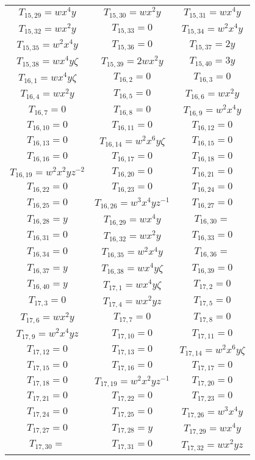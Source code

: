 \documentclass[12pt]{memoireuqam1.3}
\begin{document}
\begin{longtable}{|c|c|c|}
$T_{15,29}= wx^4y$&
$T_{15,30}= wx^2y$&
$T_{15,31}= wx^4y$\\
$T_{15,32}= wx^2y$&
$T_{15,33}= 0$&
$T_{15,34}= w^2x^4y$\\
$T_{15,35}= w^2x^4y$&
$T_{15,36}= 0$&
$T_{15,37}= 2y$\\
$T_{15,38}= wx^4y\zeta$&
$T_{15,39}= 2wx^2y$&
$T_{15,40}= 3y$\\
$T_{16,1}= wx^4y\zeta$&
$T_{16,2}= 0$&
$T_{16,3}= 0$\\
$T_{16,4}= wx^2y$&
$T_{16,5}= 0$&
$T_{16,6}= wx^2y$\\
$T_{16,7}= 0$&
$T_{16,8}= 0$&
$T_{16,9}= w^2x^4y$\\
$T_{16,10}= 0$&
$T_{16,11}= 0$&
$T_{16,12}= 0$\\
$T_{16,13}= 0$&
$T_{16,14}= w^2x^6y\zeta$&
$T_{16,15}= 0$\\
$T_{16,16}= 0$&
$T_{16,17}= 0$&
$T_{16,18}= 0$\\
$T_{16,19}= w^2x^2yz^{-2}$&
$T_{16,20}= 0$&
$T_{16,21}= 0$\\
$T_{16,22}= 0$&
$T_{16,23}= 0$&
$T_{16,24}= 0$\\
$T_{16,25}= 0$&
$T_{16,26}= w^3x^4yz^{-1}$&
$T_{16,27}= 0$\\
$T_{16,28}= y$&
$T_{16,29}= wx^4y$&
$T_{16,30}= $\\
$T_{16,31}= 0$&
$T_{16,32}= wx^2y$&
$T_{16,33}= 0$\\
$T_{16,34}= 0$&
$T_{16,35}= w^2x^4y$&
$T_{16,36}= $\\
$T_{16,37}= y$&
$T_{16,38}= wx^4y\zeta$&
$T_{16,39}= 0$\\
$T_{16,40}= y$&
$T_{17,1}= wx^4y\zeta$&
$T_{17,2}= 0$\\
$T_{17,3}= 0$&
$T_{17,4}= wx^2yz$&
$T_{17,5}= 0$\\
$T_{17,6}= wx^2y$&
$T_{17,7}= 0$&
$T_{17,8}= 0$\\
$T_{17,9}= w^2x^4yz$&
$T_{17,10}= 0$&
$T_{17,11}= 0$\\
$T_{17,12}= 0$&
$T_{17,13}= 0$&
$T_{17,14}= w^2x^6y\zeta$\\
$T_{17,15}= 0$&
$T_{17,16}= 0$&
$T_{17,17}= 0$\\
$T_{17,18}= 0$&
$T_{17,19}= w^2x^2yz^{-1}$&
$T_{17,20}= 0$\\
$T_{17,21}= 0$&
$T_{17,22}= 0$&
$T_{17,23}= 0$\\
$T_{17,24}= 0$&
$T_{17,25}= 0$&
$T_{17,26}= w^3x^4y$\\
$T_{17,27}= 0$&
$T_{17,28}= y$&
$T_{17,29}= wx^4y$\\
$T_{17,30}= $&
$T_{17,31}= 0$&
$T_{17,32}= wx^2yz$\\

\end{longtable}
\end{document}
